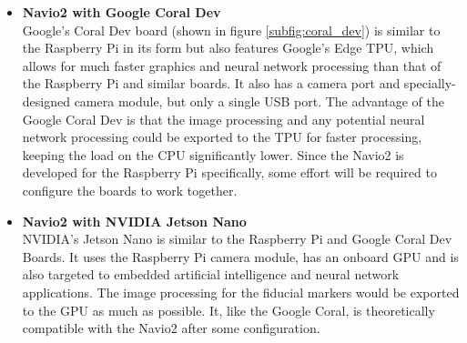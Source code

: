 \begin{itemize}
    \item \textbf{Navio2 with Google Coral Dev} \\ Google's Coral Dev board (shown in figure \ref{subfig:coral_dev}) is similar to the Raspberry Pi in its form but also features Google's Edge \gls{TPU}, which allows for much faster graphics and neural network processing than that of the Raspberry Pi and similar boards. It also has a camera port and specially-designed camera module, but only a single USB port. The advantage of the Google Coral Dev is that the image processing and any potential neural network processing could be exported to the \gls{TPU} for faster processing, keeping the load on the CPU significantly lower. Since the Navio2 is developed for the Raspberry Pi specifically, some effort will be required to configure the boards to work together.
    
    \item \textbf{Navio2 with NVIDIA Jetson Nano} \\ NVIDIA's Jetson Nano is similar to the Raspberry Pi and Google Coral Dev Boards. It uses the Raspberry Pi camera module, has an onboard GPU and is also targeted to embedded artificial intelligence and neural network applications. The image processing for the fiducial markers would be exported to the GPU as much as possible. It, like the Google Coral, is theoretically compatible with the Navio2 after some configuration. 



\end{itemize}
